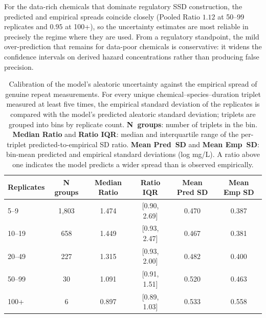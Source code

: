 For the data-rich chemicals that dominate regulatory SSD construction, the predicted and
empirical spreads coincide closely (Pooled Ratio $1.12$ at 50--99 replicates and $0.95$
at 100+), so the uncertainty estimates are most reliable in precisely the regime where
they are used. From a regulatory standpoint, the mild over-prediction that remains for
data-poor chemicals is conservative: it widens the confidence intervals on derived
hazard concentrations rather than producing false precision.


\begin{table}[ht]
    \centering
    \caption{Calibration of the model's aleatoric uncertainty against the empirical
    spread of genuine repeat measurements. For every unique chemical--species--duration
    triplet measured at least five times, the empirical standard deviation of the
    replicates is compared with the model's predicted aleatoric standard deviation;
    triplets are grouped into bins by replicate count. \textbf{N~groups}: number of
    triplets in the bin.  \textbf{Median Ratio} and \textbf{Ratio IQR}: median and
    interquartile range of the per-triplet predicted-to-empirical SD ratio. \textbf{Mean
    Pred~SD} and \textbf{Mean Emp~SD}: bin-mean predicted and empirical standard
    deviations (log mg/L). A ratio above one indicates the model predicts a wider spread
    than is observed empirically.}
    \label{tab:replicate_stats}
\begin{tabular}{lccccc}
    \toprule
    \textbf{Replicates} & \textbf{N groups} & \textbf{Median Ratio} & \textbf{Ratio IQR} & \textbf{Mean Pred SD} & \textbf{Mean Emp SD} \\
    \midrule
    5--9   & 1,803 & 1.474 & [0.90, 2.69] & 0.470 & 0.387 \\
    10--19 & 658   & 1.449 & [0.93, 2.47] & 0.467 & 0.381 \\
    20--49 & 227   & 1.315 & [0.93, 2.00] & 0.482 & 0.400 \\
    50--99 & 30    & 1.091 & [0.91, 1.51] & 0.520 & 0.463 \\
    100+   & 6     & 0.897 & [0.89, 1.03] & 0.533 & 0.558 \\
    \bottomrule
\end{tabular}
\end{table}

